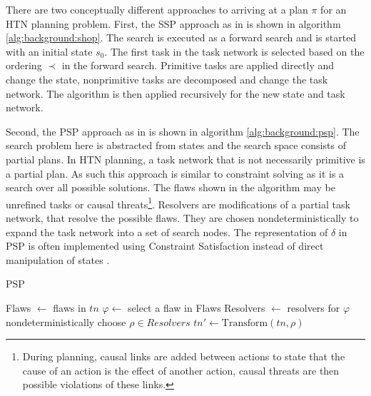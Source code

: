 There are two conceptually different approaches to arriving at a plan $\pi$ for an \ac{HTN} planning problem. 
First, the \ac{SSP} approach as in \cite{nauSHOPSimpleHierarchical1999} is shown in algorithm \ref{alg:background:shop}.
The search is executed as a forward search and is started with an initial state $s_0$.
The first task in the task network is selected based on the ordering $\prec$ in the forward search.
Primitive tasks are applied directly and change the state, nonprimitive tasks are decomposed and change the task network.
The algorithm is then applied recursively for the new state and task network.

Second, the \ac{PSP} approach as in \citet[chap.~5]{ghallabAutomatedPlanningTheory2004} is shown in algorithm \ref{alg:background:psp}.
The search problem here is abstracted from states and the search space consists of partial plans.
In \ac{HTN} planning, a task network that is not necessarily primitive is a partial plan.
As such this approach is similar to constraint solving as it is a search over all possible solutions.
The flaws shown in the algorithm may be unrefined tasks or causal threats\footnote{During planning, causal links are added between actions to state that the cause of an action is the effect of another action, causal threats are then possible violations of these links.}.
Resolvers are modifications of a partial task network, that resolve the possible flaws.
They are chosen nondeterministically to expand the task network into a set of search nodes.
The representation of $\delta$ in \ac{PSP} is often implemented using Constraint Satisfaction instead of direct manipulation of states \citep{georgievskiHTNPlanningOverview2015}.

\begin{algorithm}[t]
  \caption{PSP}
  \label{alg:background:psp}
  \KwOut{$\pi$}
  Flaws $\leftarrow$ flaws in $tn$\;
  $\varphi \leftarrow$ select a flaw in Flaws\;
  Resolvers $\leftarrow$ resolvers for $\varphi$\;
  nondeterministically choose $\rho \in Resolvers$\;
  $tn' \leftarrow \text{Transform}(tn, \rho)$\;
\end{algorithm}



